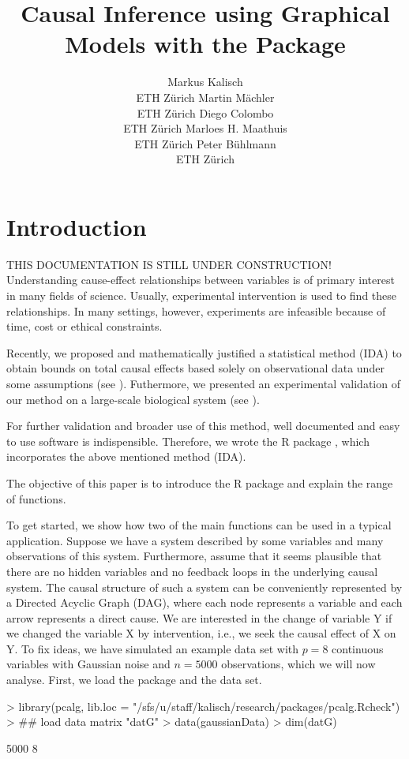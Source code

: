 \documentclass[article]{jss}
\author{Markus Kalisch\\ETH Z\"urich \And
        Martin M\"achler\\ETH Z\"urich \And
      Diego Colombo\\ETH Z\"urich \And
    Marloes H. Maathuis\\ETH Z\"urich \And
  Peter B\"uhlmann\\ETH Z\"urich}
\title{Causal Inference using Graphical Models with the Package \pkg{pcalg}}
\begin{document}

\section{Introduction}
THIS DOCUMENTATION IS STILL UNDER CONSTRUCTION! \\

Understanding cause-effect relationships between variables is of primary
interest in many fields of science. Usually, experimental intervention is
used to find these relationships. In many settings, however, experiments
are infeasible because of time, cost or ethical constraints.

Recently, we proposed and mathematically justified a statistical method
(IDA) to obtain bounds on total causal effects based solely on
observational data under some assumptions (see \cite{BuKaMa10}). Futhermore, we presented an
experimental validation of our method on a large-scale biological system
(see \cite{NatMethods10}).

For further validation and broader use of this method, well documented and
easy to use software is indispensible. Therefore, we wrote the R package
, which incorporates the above mentioned method (IDA).

The objective of this paper is to introduce the R package  and
explain the range of functions.

To get started, we show how two of the main functions can be used in a
typical application. Suppose we have a system described by some
variables and many observations of this system. Furthermore, assume
that it seems plausible that there are no hidden variables and no
feedback loops in the underlying causal system. The causal structure
of such a system can be conveniently represented by a Directed Acyclic
Graph (DAG), where each node represents a variable and each arrow
represents a direct cause. We are interested in the change of variable
Y if we changed the variable X by intervention, i.e., we seek the
causal effect of X on Y.  To fix ideas, we have simulated an example
data set with $p = 8$ continuous variables with Gaussian noise and $n
= 5000$ observations, which we will now analyse. First, we load the
package  and the data set.

\begin{Schunk}
\begin{Sinput}
>  library(pcalg, lib.loc = "/sfs/u/staff/kalisch/research/packages/pcalg.Rcheck")
>  ## load data matrix "datG"
>  data(gaussianData)
>  dim(datG)
\end{Sinput}
\begin{Soutput}
[1] 5000    8
\end{Soutput}
\end{Schunk}
\end{document}
